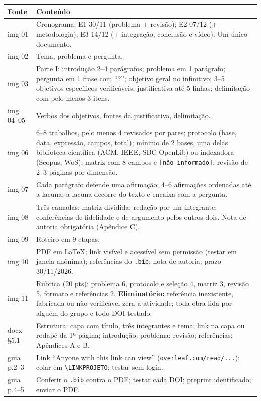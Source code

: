 \documentclass[11pt,a4paper]{article}
\begin{document}
\begin{longtable}{@{}P{2.0cm}P{14.1cm}@{}}
\toprule
Fonte & Conteúdo \\
\midrule
\endhead
img 01 & Cronograma: E1 30/11 (problema + revisão); E2 07/12 (+ metodologia); E3 14/12 (+ integração, conclusão e vídeo). Um único documento. \\
img 02 & Tema, problema e pergunta. \\
img 03 & Parte I: introdução 2--4 parágrafos; problema em 1 parágrafo; pergunta em 1 frase com ``?''; objetivo geral no infinitivo; 3--5 objetivos específicos verificáveis; justificativa até 5 linhas; delimitação com pelo menos 3 itens. \\
img 04--05 & Verbos dos objetivos, fontes da justificativa, delimitação. \\
img 06 & 6--8 trabalhos, pelo menos 4 revisados por pares; protocolo (base, data, expressão, campos, total); mínimo de 2 bases, uma delas biblioteca científica (ACM, IEEE, SBC OpenLib) ou indexadora (Scopus, WoS); matriz com 8 campos e \texttt{[não informado]}; revisão de 2--3 páginas por dimensão. \\
img 07 & Cada parágrafo defende uma afirmação; 4--6 afirmações ordenadas até a lacuna; a lacuna decorre do texto e encaixa com a pergunta. \\
img 08 & Três camadas: matriz dividida; redação por um integrante; conferências de fidelidade e de argumento pelos outros dois. Nota de autoria obrigatória (Apêndice C). \\
img 09 & Roteiro em 9 etapas. \\
img 10 & PDF em LaTeX; link visível e acessível sem permissão (testar em janela anônima); referências do \texttt{.bib}; nota de autoria; prazo 30/11/2026. \\
img 11 & Rubrica (20 pts): problema 6, protocolo e seleção 4, matriz 3, revisão 5, formato e referências 2. \textbf{Eliminatório:} referência inexistente, fabricada ou não verificável zera a atividade; toda obra lida por alguém do grupo e todo DOI testado. \\
docx §5.1 & Estrutura: capa com título, três integrantes e tema; link na capa ou rodapé da 1ª página; introdução; problema; revisão; referências; Apêndices A e B. \\
guia p.2--3 & Link ``Anyone with this link can view'' (\texttt{overleaf.com/read/...}); colar em \texttt{\textbackslash LINKPROJETO}; testar sem login. \\
guia p.4--5 & Conferir o \texttt{.bib} contra o PDF; testar cada DOI; preprint identificado; enviar o PDF. \\
\bottomrule
\end{longtable}
\end{document}
